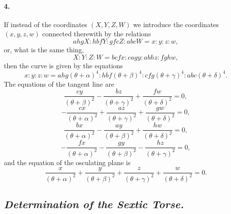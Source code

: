 \documentclass[11pt,a4paper]{article}
\begin{document}
\paragraph{4.}
If instead of the coordinates $(X, Y, Z, W)$ we introduce the coordinates $(x, y, z, w)$
connected therewith by the relations
\[
ahgX : hbfY : gfcZ : abcW = x : y : z : w,
\]
or, what is the same thing,
\[
X : Y : Z : W = bcfx : cagy : abhz : fghw,
\]
then the curve is given by the equations
\[
x : y : z : w = ahg(\theta + \alpha)^4 : hbf(\theta + \beta)^4 :
   cfg(\theta + \gamma)^4 : abc(\theta + \delta)^4.
\]
The equations of the tangent line are
\[
\frac{cy}{(\theta + \beta)^2} - \frac{bz}{(\theta + \gamma)^2} + \frac{fw}{(\theta + \delta)^2} = 0,
\]
\[
- \frac{cx}{(\theta + \alpha)^2} + \frac{az}{(\theta + \gamma)^2} + \frac{gw}{(\theta + \delta)^2} = 0,
\]
\[
\frac{bx}{(\theta + \alpha)^2} - \frac{ay}{(\theta + \beta)^2} + \frac{hw}{(\theta + \delta)^2} = 0,
\]
\[
- \frac{fx}{(\theta + \alpha)^2} - \frac{gy}{(\theta + \beta)^2} - \frac{hz}{(\theta + \gamma)^2} = 0,
\]
and the equation of the osculating plane is
\[
\frac{x}{(\theta + \alpha)^2} + \frac{y}{(\theta + \beta)^2}
+ \frac{z}{(\theta + \gamma)^2} + \frac{w}{(\theta + \delta)^2} = 0.
\]

\subsection*{\textit{Determination of the Sextic Torse.}}
\end{document}
